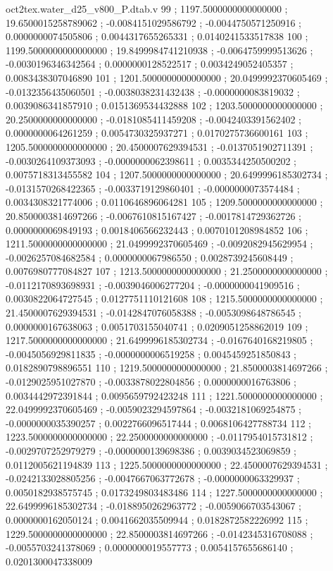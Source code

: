 \begin{filecontents}[overwrite]{oct2tex.water_d25_v800_P.dtab.v}
99 ; 1197.5000000000000000 ; 19.6500015258789062 ; -0.0084151029586792 ; -0.0044750571250916 ; 0.0000000074505806 ; 0.0044317655265331 ; 0.0140241533517838
100 ; 1199.5000000000000000 ; 19.8499984741210938 ; -0.0064759999513626 ; -0.0030196346342564 ; 0.0000000128522517 ; 0.0034249052405357 ; 0.0083438307046890
101 ; 1201.5000000000000000 ; 20.0499992370605469 ; -0.0132356435060501 ; -0.0038038231432438 ; -0.0000000083819032 ; 0.0039086341857910 ; 0.0151369534432888
102 ; 1203.5000000000000000 ; 20.2500000000000000 ; -0.0181085411459208 ; -0.0042403391562402 ; 0.0000000064261259 ; 0.0054730325937271 ; 0.0170275736600161
103 ; 1205.5000000000000000 ; 20.4500007629394531 ; -0.0137051902711391 ; -0.0030264109373093 ; -0.0000000062398611 ; 0.0035344250500202 ; 0.0075718313455582
104 ; 1207.5000000000000000 ; 20.6499996185302734 ; -0.0131570268422365 ; -0.0033719129860401 ; -0.0000000073574484 ; 0.0034308321774006 ; 0.0110646896064281
105 ; 1209.5000000000000000 ; 20.8500003814697266 ; -0.0067610815167427 ; -0.0017814729362726 ; 0.0000000069849193 ; 0.0018406566232443 ; 0.0070101208984852
106 ; 1211.5000000000000000 ; 21.0499992370605469 ; -0.0092082945629954 ; -0.0026257084682584 ; 0.0000000067986550 ; 0.0028739245608449 ; 0.0076980777084827
107 ; 1213.5000000000000000 ; 21.2500000000000000 ; -0.0112170893698931 ; -0.0039046006277204 ; -0.0000000041909516 ; 0.0030822064727545 ; 0.0127751110121608
108 ; 1215.5000000000000000 ; 21.4500007629394531 ; -0.0142847076058388 ; -0.0053098648786545 ; 0.0000000167638063 ; 0.0051703155040741 ; 0.0209051258862019
109 ; 1217.5000000000000000 ; 21.6499996185302734 ; -0.0167640168219805 ; -0.0045056929811835 ; -0.0000000006519258 ; 0.0045459251850843 ; 0.0182890798896551
110 ; 1219.5000000000000000 ; 21.8500003814697266 ; -0.0129025951027870 ; -0.0033878022804856 ; 0.0000000016763806 ; 0.0034442972391844 ; 0.0095659792423248
111 ; 1221.5000000000000000 ; 22.0499992370605469 ; -0.0059023294597864 ; -0.0032181069254875 ; -0.0000000035390257 ; 0.0022766096517444 ; 0.0068106427788734
112 ; 1223.5000000000000000 ; 22.2500000000000000 ; -0.0117954015731812 ; -0.0029707252979279 ; -0.0000000139698386 ; 0.0039034523069859 ; 0.0112005621194839
113 ; 1225.5000000000000000 ; 22.4500007629394531 ; -0.0242133028805256 ; -0.0047667063772678 ; -0.0000000063329937 ; 0.0050182938575745 ; 0.0173249803483486
114 ; 1227.5000000000000000 ; 22.6499996185302734 ; -0.0188950262963772 ; -0.0059066703543067 ; 0.0000000162050124 ; 0.0041662035509944 ; 0.0182872582226992
115 ; 1229.5000000000000000 ; 22.8500003814697266 ; -0.0142345316708088 ; -0.0055703241378069 ; 0.0000000019557773 ; 0.0054157655686140 ; 0.0201300047338009

\end{filecontents}
